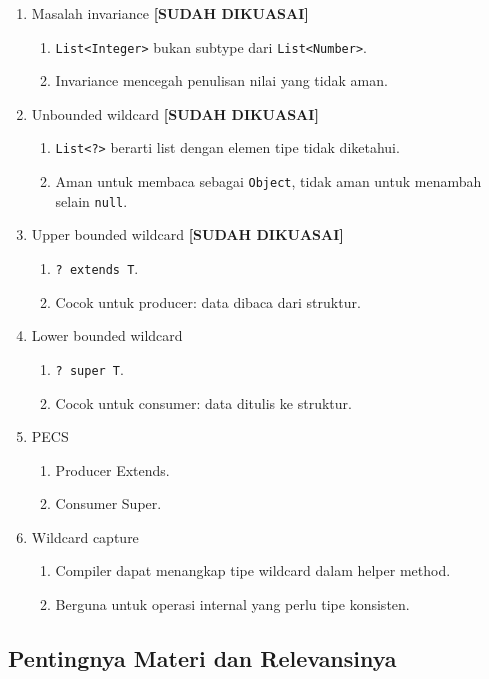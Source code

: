 \begin{enumerate}
    \item Masalah invariance \textbf{[SUDAH DIKUASAI]}
    \begin{enumerate}
        \item \texttt{List<Integer>} bukan subtype dari \texttt{List<Number>}.
        \item Invariance mencegah penulisan nilai yang tidak aman.
    \end{enumerate}
    \item Unbounded wildcard \textbf{[SUDAH DIKUASAI]}
    \begin{enumerate}
        \item \texttt{List<?>} berarti list dengan elemen tipe tidak diketahui.
        \item Aman untuk membaca sebagai \texttt{Object}, tidak aman untuk menambah selain \texttt{null}.
    \end{enumerate}
    \item Upper bounded wildcard \textbf{[SUDAH DIKUASAI]}
    \begin{enumerate}
        \item \texttt{? extends T}.
        \item Cocok untuk producer: data dibaca dari struktur.
    \end{enumerate}
    \item Lower bounded wildcard
    \begin{enumerate}
        \item \texttt{? super T}.
        \item Cocok untuk consumer: data ditulis ke struktur.
    \end{enumerate}
    \item PECS
    \begin{enumerate}
        \item Producer Extends.
        \item Consumer Super.
    \end{enumerate}
    \item Wildcard capture
    \begin{enumerate}
        \item Compiler dapat menangkap tipe wildcard dalam helper method.
        \item Berguna untuk operasi internal yang perlu tipe konsisten.
    \end{enumerate}
\end{enumerate}

\subsection{Pentingnya Materi dan Relevansinya}

